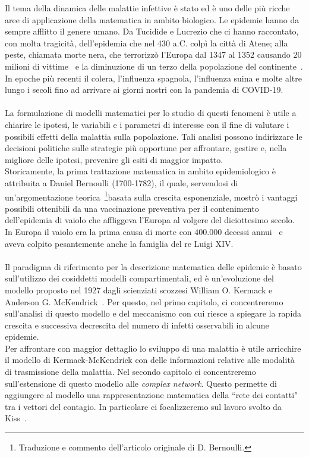 \documentclass[12pt,a4paper,twoside]{report}
\begin{document}
Il tema della dinamica delle malattie infettive \`e stato ed \`e uno delle pi\`u ricche aree di applicazione della matematica in ambito biologico.  Le epidemie hanno  da sempre afflitto il genere umano.  Da Tucidide e Lucrezio che ci hanno raccontato,  con molta tragicit\`a,  dell'epidemia che nel 430 a.C.  colp\`i la citt\`a di Atene; alla  peste,  chiamata morte nera,   che terrorizz\`o l'Europa dal 1347 al 1352 causando $20$ milioni di vittime~\cite{ujvari2020storia} e  la diminuzione di  un terzo della popolazione del continente~\cite{alchon2003pest}.  In epoche pi\`u recenti il colera,  l'influenza spagnola,  l'influenza suina e molte altre lungo i  secoli fino ad arrivare ai giorni nostri con la pandemia di COVID-19.\\ \\
La formulazione di modelli matematici per lo  studio di questi fenomeni \`e utile a chiarire le ipotesi, le variabili e i parametri di interesse con il fine di valutare i possibili effetti della malattia sulla popolazione. Tali analisi possono indirizzare le decisioni politiche sulle strategie pi\`u opportune per affrontare, gestire e, nella migliore delle ipotesi, prevenire gli esiti di maggior impatto.\\ Storicamente,  la prima trattazione matematica in ambito   epidemiologico \`e attribuita  a Daniel Bernoulli (1700-1782), il quale, servendosi di un'argomentazione teorica~\cite{Bernoulli}\footnote{Traduzione e commento dell'articolo originale di D. Bernoulli.}basata sulla crescita esponenziale,  mostr\`o i  vantaggi possibili ottenibili da una vaccinazione preventiva per il contenimento dell'epidemia di vaiolo che affliggeva l'Europa al volgere del diciottesimo secolo. In Europa il vaiolo era la prima causa di morte con $400.000$ decessi annui~\cite{VAIOLO} e aveva colpito pesantemente anche la famiglia del re Luigi XIV.\\ \\
Il paradigma di riferimento per la descrizione matematica delle epidemie \`e basato sull'utilizzo dei cosiddetti modelli compartimentali, ed \`e un'evoluzione del modello proposto nel 1927 dagli scienziati scozzesi William O. Kermack e Anderson G. McKendrick~\cite{kermack}.  Per questo, nel primo capitolo, ci concentreremo sull'analisi di questo modello e del meccanismo con cui riesce a spiegare la rapida crescita e successiva decrescita del numero di infetti osservabili in alcune epidemie.\\ 
Per affrontare con maggior dettaglio lo sviluppo di una malattia \`e utile arricchire il modello di Kermack-McKendrick con delle informazioni relative alle modalit\`a di trasmissione della malattia. Nel secondo capitolo ci concentreremo sull'estensione di questo modello alle \textit{complex network}. Questo permette di aggiungere al modello una rappresentazione matematica della  ``rete dei contatti" tra i vettori del contagio. In particolare ci focalizzeremo sul lavoro svolto da Kiss~\cite{KISS}.\\
\end{document}
